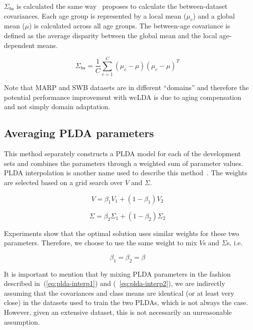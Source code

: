 \documentclass[a4paper]{article}
\begin{document}
$\Sigma_{ba}$ is calculated the same way~\cite{weightedLDA} proposes to calculate the between-dataset covariances. Each age group is represented by a local mean ($\mu_c$) and a global mean ($\mu$) is calculated across all age groups. The between-age covariance is defined as the average disparity between the global mean and the local age-dependent means. 

\begin{equation}
\Sigma_{ba} = \frac{1}{C}\sum_{c=1}^{C}(\mu_c - \mu)(\mu_c - \mu)^T
\end{equation}

Note that MARP and SWB datasets are in different ``domains'' and therefore the potential performance improvement with wcLDA is due to aging compensation and not simply domain adaptation.

\subsection{Averaging PLDA parameters}
This method separately constructs a PLDA model for each of the development sets and combines the parameters through a weighted sum of parameter values. PLDA interpolation is another name used to describe this method~\cite{garcia2014supervised}. The weights are selected based on a grid search over $V$ and $\Sigma$. 

\begin{equation}
\label{eq:plda-interp1}
V = \beta_1V_1 + (1 - \beta_1)V_2
\end{equation}

\begin{equation}
\label{eq:plda-interp2}
\Sigma = \beta_2\Sigma_1 + (1 - \beta_2)\Sigma_2
\end{equation}

Experiments show that the optimal solution uses similar weights for these two parameters. Therefore, we choose to use the same weight to mix $V$s and $\Sigma$s, i.e. 


\begin{equation}
\beta_1 = \beta_2 = \beta
\end{equation}

It is important to mention that by mixing PLDA parameters in the fashion described in~(\ref{eq:plda-interp1}) and (~\ref{eq:plda-interp2}), we are indirectly assuming that the covariances and class means are identical (or at least very close) in the datasets used to train the two PLDAs, which is not always the case. However, given an extensive dataset, this is not necessarily an unreasonable assumption. 
\end{document}

